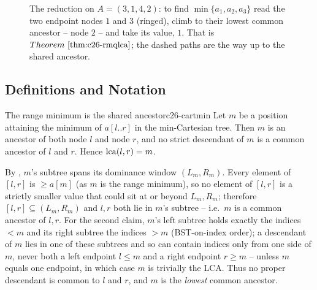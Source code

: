 \begin{figure}[H]
\centering
{}
\caption{The reduction on $A=(3,1,4,2)$: to find $\min\{a_1,a_2,a_3\}$ read the two endpoint nodes $1$
and $3$ (ringed), climb to their lowest common ancestor -- node $2$ -- and take its value, $1$. That is
$\thmref{c26-rmqlca}$; the dashed paths are the way up to the shared ancestor.}\label{fig:c26-rmqfig}
\end{figure}

\subsection{Definitions and Notation}

\begin{lemma}{The range minimum is the shared ancestor}{c26-cartmin}
Let $m$ be a position attaining the minimum of $a[l..r]$ in the min-Cartesian tree. Then $m$ is an
ancestor of both node $l$ and node $r$, and no strict descendant of $m$ is a common ancestor of $l$ and
$r$. Hence $\operatorname{lca}(l,r)=m$.
\end{lemma}
\begin{proofbox}
By , $m$'s subtree spans its dominance window $(L_m,R_m)$. Every element of $[l,r]$ is
$\ge a[m]$ (as $m$ is the range minimum), so no element of $[l,r]$ is a strictly smaller value that could
sit at or beyond $L_m,R_m$; therefore $[l,r]\subseteq(L_m,R_m)$ and $l,r$ both lie in $m$'s subtree --
i.e.\ $m$ is a common ancestor of $l,r$. For the second claim, $m$'s left subtree holds exactly the
indices $<m$ and its right subtree the indices $>m$ (BST-on-index order); a descendant of $m$ lies in one
of these subtrees and so can contain indices only from one side of $m$, never both a left endpoint
$l\le m$ and a right endpoint $r\ge m$ -- unless $m$ equals one endpoint, in which case $m$ is trivially
the LCA. Thus no proper descendant is common to $l$ and $r$, and $m$ is the \emph{lowest} common ancestor. \end{proofbox}

